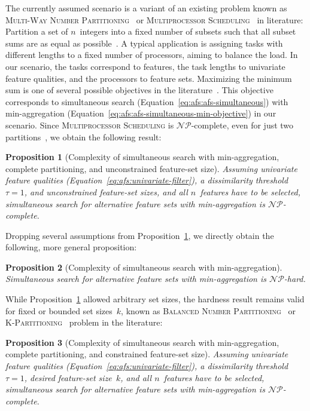 \documentclass[iicol, sn-basic, Numbered]{sn-jnl} %
\theoremstyle{plain}
\newtheorem{proposition}{Proposition}
\theoremstyle{definition}
\begin{document}
The currently assumed scenario is a variant of an existing problem known as \textsc{Multi-Way Number Partitioning}~\cite{lawrinenko2017identical} or \textsc{Multiprocessor Scheduling}~\cite{garey2003computers} in literature:
Partition a set of $n$~integers into a fixed number of subsets such that all subset sums are as equal as possible~\cite{korf2010objective}.
A typical application is assigning tasks with different lengths to a fixed number of processors, aiming to balance the load.
In our scenario, the tasks correspond to features, the task lengths to univariate feature qualities, and the processors to feature sets. 
Maximizing the minimum sum is one of several possible objectives in the literature~\cite{korf2010objective, lawrinenko2017identical}.
This objective corresponds to simultaneous search (Equation~\ref{eq:afs:afs-simultaneous}) with min-aggregation (Equation~\ref{eq:afs:afs-simultaneous-min-objective}) in our scenario.
Since \textsc{Multiprocessor Scheduling} is $\mathcal{NP}$-complete, even for just two partitions~\cite{garey2003computers}, we obtain the following result:
%
\begin{proposition}[Complexity of simultaneous search with min-aggregation, complete partitioning, and unconstrained feature-set size]
	Assuming univariate feature qualities (Equation~\ref{eq:afs:univariate-filter}), a dissimilarity threshold~$\tau = 1$, and unconstrained feature-set sizes, and all $n$~features have to be selected, simultaneous search for alternative feature sets with min-aggregation is $\mathcal{NP}$-complete.
	\label{prop:afs:complexity-partitioning-min-unconstrained-k}
\end{proposition}
%
Dropping several assumptions from Proposition~\ref{prop:afs:complexity-partitioning-min-unconstrained-k}, we directly obtain the following, more general proposition:
%
\begin{proposition}[Complexity of simultaneous search with min-aggregation]
	Simultaneous search for alternative feature sets with min-aggregation is $\mathcal{NP}$-hard.
	\label{prop:afs:complexity-simultaneous-np}
\end{proposition}
%
While Proposition~\ref{prop:afs:complexity-partitioning-min-unconstrained-k} allowed arbitrary set sizes, the hardness result remains valid for fixed or bounded set sizes~$k$, known as \textsc{Balanced Number Partitioning}~\cite{michiels2012computer, zhang2011heuristic} or \textsc{K-Partitioning}~\cite{he2003kappa, lawrinenko2018reduction} problem in the literature:
%
\begin{proposition}[Complexity of simultaneous search with min-aggregation, complete partitioning, and constrained feature-set size]
	Assuming univariate feature qualities (Equation~\ref{eq:afs:univariate-filter}), a dissimilarity threshold~$\tau = 1$, desired feature-set size~$k$, and all $n$~features have to be selected, simultaneous search for alternative feature sets with min-aggregation is $\mathcal{NP}$-complete.
	\label{prop:afs:complexity-partitioning-min-constrained-k}
\end{proposition}
\end{document}
